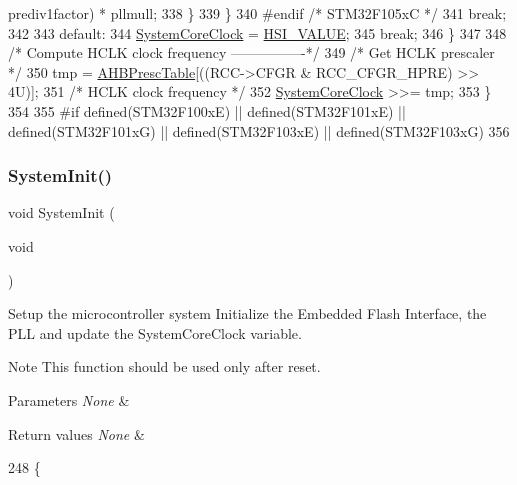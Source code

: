 \begin{DoxyCode}
      prediv1factor) * pllmull;                         
338         \}
339       \}
340 \textcolor{preprocessor}{#endif }\textcolor{comment}{/* STM32F105xC */}\textcolor{preprocessor}{ }
341       \textcolor{keywordflow}{break};
342 
343     \textcolor{keywordflow}{default}:
344       \hyperlink{group__STM32F1xx__System__Private__Variables_gaa3cd3e43291e81e795d642b79b6088e6}{SystemCoreClock} = \hyperlink{group__STM32F1xx__System__Private__Defines_gaaa8c76e274d0f6dd2cefb5d0b17fbc37}{HSI\_VALUE};
345       \textcolor{keywordflow}{break};
346   \}
347   
348   \textcolor{comment}{/* Compute HCLK clock frequency ----------------*/}
349   \textcolor{comment}{/* Get HCLK prescaler */}
350   tmp = \hyperlink{group__STM32F1xx__System__Private__Variables_ga53cb26d01524d9560f98101a2c597c40}{AHBPrescTable}[((RCC->CFGR & RCC\_CFGR\_HPRE) >> 4U)];
351   \textcolor{comment}{/* HCLK clock frequency */}
352   \hyperlink{group__STM32F1xx__System__Private__Variables_gaa3cd3e43291e81e795d642b79b6088e6}{SystemCoreClock} >>= tmp;  
353 \}
354 
355 \textcolor{preprocessor}{#if defined(STM32F100xE) || defined(STM32F101xE) || defined(STM32F101xG) || defined(STM32F103xE) ||
       defined(STM32F103xG)}
356 \end{DoxyCode}
\mbox{\label{group__STM32F1xx__System__Private__Functions_ga93f514700ccf00d08dbdcff7f1224eb2}} 
\subsubsection{\texorpdfstring{System\+Init()}{SystemInit()}}
{\footnotesize\ttfamily void System\+Init (\begin{DoxyParamCaption}\item[{void}]{ }\end{DoxyParamCaption})}



Setup the microcontroller system Initialize the Embedded Flash Interface, the P\+LL and update the System\+Core\+Clock variable. 

\begin{DoxyNote}{Note}
This function should be used only after reset. 
\end{DoxyNote}

\begin{DoxyParams}{Parameters}
{\em None} & \\
\hline
\end{DoxyParams}

\begin{DoxyRetVals}{Return values}
{\em None} & \\
\hline
\end{DoxyRetVals}

\begin{DoxyCode}
248 \{
\end{DoxyCode}
